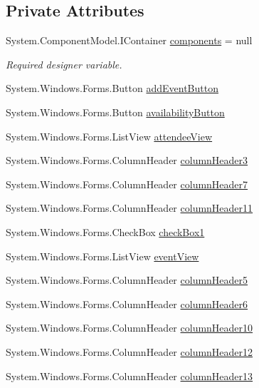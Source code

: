 \subsection*{Private Attributes}
\begin{DoxyCompactItemize}
\item 
System.\+Component\+Model.\+I\+Container \hyperlink{classProject1_1_1MainWindow_ab73af7a7685fb735923099a87cc5c81a}{components} = null
\begin{DoxyCompactList}\small\item\em Required designer variable. \end{DoxyCompactList}\item 
System.\+Windows.\+Forms.\+Button \hyperlink{classProject1_1_1MainWindow_a3d99b09991f5611424ec9886d8805fce}{add\+Event\+Button}
\item 
System.\+Windows.\+Forms.\+Button \hyperlink{classProject1_1_1MainWindow_a3e34c89029ddf939d607ea8638e444c8}{availability\+Button}
\item 
System.\+Windows.\+Forms.\+List\+View \hyperlink{classProject1_1_1MainWindow_a87e159953fb2bc0cb9276dc85f2e7979}{attendee\+View}
\item 
System.\+Windows.\+Forms.\+Column\+Header \hyperlink{classProject1_1_1MainWindow_a2814c0939a2ecfdcb2506f83fcfff080}{column\+Header3}
\item 
System.\+Windows.\+Forms.\+Column\+Header \hyperlink{classProject1_1_1MainWindow_acaaac5d2776ef69f8e9abbb61b06ee64}{column\+Header7}
\item 
System.\+Windows.\+Forms.\+Column\+Header \hyperlink{classProject1_1_1MainWindow_aaed23b23d4df062fe99afdee1730e800}{column\+Header11}
\item 
System.\+Windows.\+Forms.\+Check\+Box \hyperlink{classProject1_1_1MainWindow_a2e6cf3cf871c168672d16d8c12211047}{check\+Box1}
\item 
System.\+Windows.\+Forms.\+List\+View \hyperlink{classProject1_1_1MainWindow_a48288e76cf64892256e3ec2f3173bcb8}{event\+View}
\item 
System.\+Windows.\+Forms.\+Column\+Header \hyperlink{classProject1_1_1MainWindow_a8cc8ae19b57ec667fa7cc09ed7446056}{column\+Header5}
\item 
System.\+Windows.\+Forms.\+Column\+Header \hyperlink{classProject1_1_1MainWindow_a5041ff81bbef58fc72cb0914afa984ea}{column\+Header6}
\item 
System.\+Windows.\+Forms.\+Column\+Header \hyperlink{classProject1_1_1MainWindow_ac624f584eb3fbe129389e2b3e287f596}{column\+Header10}
\item 
System.\+Windows.\+Forms.\+Column\+Header \hyperlink{classProject1_1_1MainWindow_a7ad81e39a25ae4972c28b1d805b827a9}{column\+Header12}
\item 
System.\+Windows.\+Forms.\+Column\+Header \hyperlink{classProject1_1_1MainWindow_ab661e6cae54e37f16fed3117b6b038e6}{column\+Header13}
\end{DoxyCompactItemize}


